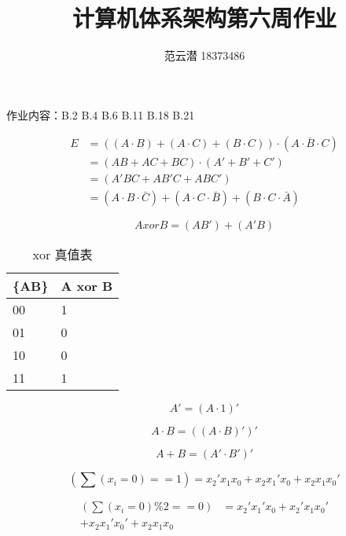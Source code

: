 \documentclass[lang=cn,11pt,a4paper,cite=authoryear,twocolumn]{elegantpaper}
\title{计算机体系架构\quad 第六周作业}
\author{范云潜 18373486}
\institute{微电子学院 184111 班}
\date{\zhtoday}
\begin{document}
\maketitle

作业内容：B.2 B.4 B.6 B.11 B.18 B.21 



\[\begin{aligned}
    E &=((A \cdot B)+(A \cdot C)+(B \cdot C)) \cdot(\overline{A \cdot B \cdot C}) \\
    &= (AB + AC + BC) \cdot (A' + B' + C') \\
    &= (A'BC + AB'C + ABC') \\ 
    &=(A \cdot B \cdot \bar{C})+(A \cdot C \cdot \bar{B})+(B \cdot C \cdot \bar{A})
\end{aligned}\]


\[A xor B = (A B') + (A' B)\]

\begin{table}[htb]
\caption{xor 真值表}
\centering
\label{tab:my-table}
\begin{tabular}{ll}\hline
\{AB\} & A xor B \\ \hline 
00     & 1       \\
01     & 0       \\
10     & 0       \\
11     & 1      \\\hline
\end{tabular}
\end{table}



\[A' = (A \cdot 1)'\]

\[A \cdot B = ((A \cdot B)')'\]

\[A + B = (A' \cdot B')'\]



\[(\sum (x_i = 0) == 1) = x_2'x_1x_0 + x_2x_1'x_0 + x_2x_1x_0'\]


\[\begin{aligned}
    (\sum (x_i = 0) \% 2 == 0) &= x_2'x_1'x_0 + x_2'x_1x_0'\\
     + x_2x_1'x_0' + x_2x_1x_0
\end{aligned}\]

\end{document}
